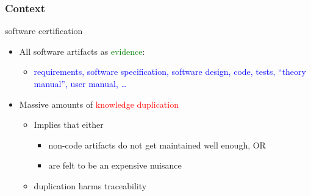 \documentclass{beamer}
\begin{document}
\begin{frame}
\frametitle{Context}
{\Large software certification}
\vspace*{.2cm}
\begin{itemize}
\item<3->All software artifacts as \textcolor{green}{evidence}:
\begin{itemize}
\item \textcolor{blue}{requirements, software specification, software design, code, 
  tests, ``theory manual'', user manual, \ldots}
\end{itemize}
\vspace*{.5cm}
\item<4->Massive amounts of \textcolor{red}{knowledge duplication}
\begin{itemize}
  \item Implies that either
  \begin{itemize}
    \item non-code artifacts do not get maintained well enough, OR
    \item are felt to be an expensive nuisance
  \end{itemize}
  \item duplication harms traceability
\end{itemize}
\end{itemize}
\vfill
\end{frame}
\end{document}
